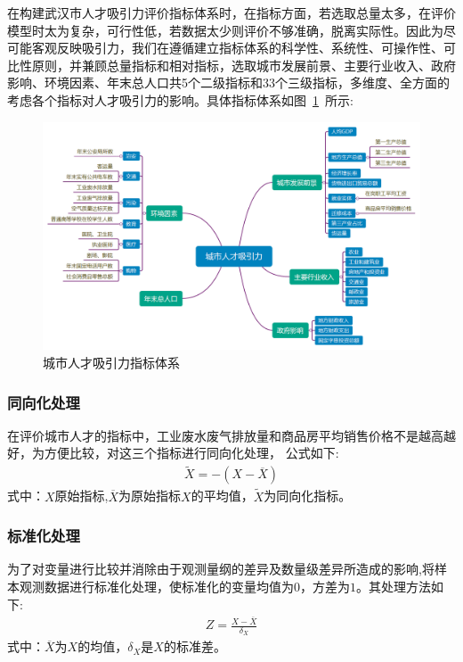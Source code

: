 \documentclass{whutmod}
\begin{document}
		在构建武汉市人才吸引力评价指标体系时，在指标方面，若选取总量太多，在评价模型时太为复杂，可行性低，若数据太少则评价不够准确，脱离实际性。因此为尽可能客观反映吸引力，我们在遵循建立指标体系的科学性、系统性、可操作性、可比性原则\parencite{lepawsky2010metropolis}，并兼顾总量指标和相对指标，选取城市发展前景、主要行业收入、政府影响、环境因素、年末总人口共5个二级指标和33个三级指标，多维度、全方面的考虑各个指标对人才吸引力的影响。具体指标体系如图~\ref{lct}~所示: 	
		\begin{figure}[H]
			\centering
			\includegraphics[width=\textwidth]{figures/clt.png}
			\caption{城市人才吸引力指标体系}\label{lct}
		\end{figure}  
		
		\subsubsection{同向化处理}

		在评价城市人才的指标中，工业废水废气排放量和商品房平均销售价格不是越高越好，为方便比较，对这三个指标进行同向化处理\parencite{张瑞红2012河南省产业集群环境人才吸引力评价研究}， 公式如下:
		\begin{gather}
		\widetilde{X}=-(X-\overline{X})
		\end{gather}
		式中：$X$原始指标,$\overline{X}$为原始指标$X$的平均值，$\widetilde{X}$为同向化指标。
		
		\subsubsection{标准化处理}
		为了对变量进行比较并消除由于观测量纲的差异及数量级差异所造成的影响,将样本观测数据进行标准化处理，使标准化的变量均值为$0$，方差为$1$。其处理方法如下:
		\begin{gather}
		Z=\frac{X-\overline{X}}{\delta_{X}}
		\end{gather}
		式中：$\overline{X}$为$X$的均值，$\delta_{X}$是$X$的标准差。
		
\end{document}
